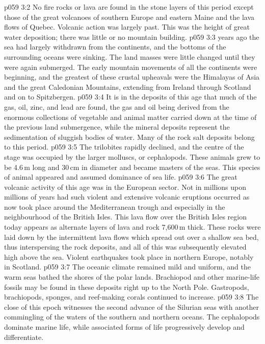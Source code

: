 \vs p059 3:2 No fire rocks or lava are found in the stone layers of this period except those of the great volcanoes of southern Europe and eastern Maine and the lava flows of Quebec. Volcanic action was largely past. This was the height of great water deposition; there was little or no mountain building.
\vs p059 3:3 \pc {} years ago the sea had largely withdrawn from the continents, and the bottoms of the surrounding oceans were sinking. The land masses were little changed until they were again submerged. The early mountain movements of all the continents were beginning, and the greatest of these crustal upheavals were the Himalayas of Asia and the great Caledonian Mountains, extending from Ireland through Scotland and on to Spitzbergen.
\vs p059 3:4 It is in the deposits of this age that much of the gas, oil, zinc, and lead are found, the gas and oil being derived from the enormous collections of vegetable and animal matter carried down at the time of the previous land submergence, while the mineral deposits represent the sedimentation of sluggish bodies of water. Many of the rock salt deposits belong to this period.
\vs p059 3:5 The trilobites rapidly declined, and the centre of the stage was occupied by the larger molluscs, or cephalopods. These animals grew to be 4.6\,m long and 30\,cm in diameter and became masters of the seas. This species of animal appeared  and assumed dominance of sea life.
\vs p059 3:6 The great volcanic activity of this age was in the European sector. Not in millions upon millions of years had such violent and extensive volcanic eruptions occurred as now took place around the Mediterranean trough and especially in the neighbourhood of the British Isles. This lava flow over the British Isles region today appears as alternate layers of lava and rock 7,600\,m thick. These rocks were laid down by the intermittent lava flows which spread out over a shallow sea bed, thus interspersing the rock deposits, and all of this was subsequently elevated high above the sea. Violent earthquakes took place in northern Europe, notably in Scotland.
\vs p059 3:7 The oceanic climate remained mild and uniform, and the warm seas bathed the shores of the polar lands. Brachiopod and other marine\hyp{}life fossils may be found in these deposits right up to the North Pole. Gastropods, brachiopods, sponges, and reef\hyp{}making corals continued to increase.
\vs p059 3:8 The close of this epoch witnesses the second advance of the Silurian seas with another commingling of the waters of the southern and northern oceans. The cephalopods dominate marine life, while associated forms of life progressively develop and differentiate.
